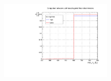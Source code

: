  
\begin{figure}[ht]
\begin{center}
\captionsetup[subfloat]{farskip=0pt,captionskip=0.0cm,labelformat=empty}
\includegraphics[clip,width=0.5\textwidth]{figuras/AppendiceB/againstMuonWP/againstMuon.pdf}
\end{center}
\end{figure}
